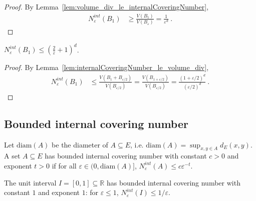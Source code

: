 \begin{proof}
By Lemma~\ref{lem:volume_div_le_internalCoveringNumber},
\begin{align*}
  N^{int}_\varepsilon(B_1)
  &\ge \frac{V(B_1)}{V(B_\varepsilon)}
  = \frac{1}{\varepsilon^d}
  \: .
\end{align*}

\end{proof}


\begin{lemma}\label{lem:internalCoveringNumber_closedBall_le}
  \leanok
$N_\varepsilon^{int}(B_1) \le \left(\frac{2}{\varepsilon} + 1\right)^d$.
\end{lemma}

\begin{proof}
By Lemma~\ref{lem:internalCoveringNumber_le_volume_div},
\begin{align*}
  N^{int}_\varepsilon(B_1)
  &\le \frac{V(B_1 + B_{\varepsilon/2})}{V(B_{\varepsilon/2})}
  = \frac{V(B_{1 + \varepsilon/2})}{V(B_{\varepsilon/2})}
  = \frac{(1 + \varepsilon/2)^d}{(\varepsilon/2)^d}
  \: .
\end{align*}
\end{proof}


\subsection{Bounded internal covering number}

\begin{definition}\label{def:HasBoundedInternalCoveringNumber}
  \leanok
  Let $\mathrm{diam}(A)$ be the diameter of $A \subseteq E$, i.e. $\mathrm{diam}(A) = \sup_{x,y \in A} d_E(x, y)$.
  A set $A \subseteq E$ has bounded internal covering number with constant $c>0$ and exponent $t>0$ if for all $\varepsilon \in (0, \mathrm{diam}(A)]$, $N^{int}_\varepsilon(A) \le c \varepsilon^{-t}$.
\end{definition}


\begin{lemma}\label{lem:hasBoundedInternalCoveringNumber_unitInterval}
  \leanok
The unit interval $I = [0, 1] \subseteq \mathbb{R}$ has bounded internal covering number with constant $1$ and exponent $1$: for $\varepsilon \le 1$, $N^{int}_\varepsilon(I) \le 1/\varepsilon$.
\end{lemma}

